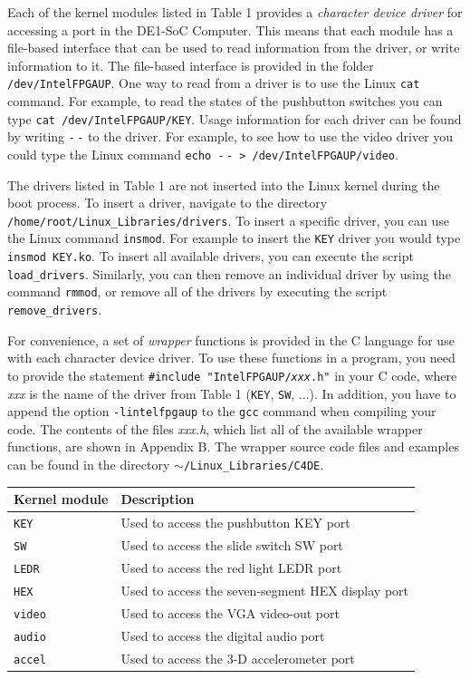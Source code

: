 \documentclass[11pt, twoside, pdftex]{article}
\begin{document}
Each of the kernel modules listed in Table 1 provides a {\it character device driver} for
accessing a port in the DE1-SoC Computer. This means that each module has a file-based
interface that can be used to read information from the driver, or write information to
it. The file-based interface is provided in the folder \texttt{/dev/IntelFPGAUP}. One way to
read from a driver is to use the Linux \texttt{cat} command. For example, to read the
states of the pushbutton switches you can type \texttt{cat /dev/IntelFPGAUP/KEY}. Usage 
information for each driver can be found by writing \texttt{-$\,$-} to the driver. For example, 
to see how to use the video driver you could type the Linux command
\texttt{echo -$\,$- > /dev/IntelFPGAUP/video}. 

The drivers listed in Table 1 are not inserted into the Linux kernel during the boot
process. To insert a driver, navigate to the directory
\texttt{/home/root/Linux\_Libraries/drivers}. To insert a specific driver, you can use the
Linux command \texttt{insmod}. For example to insert the \texttt{KEY} driver you would
type \texttt{insmod KEY.ko}. To insert all available drivers, you can execute the script
\texttt{load\_drivers}. Similarly, you can then remove an individual driver by using the
command \texttt{rmmod}, or remove all of the drivers by executing the script
\texttt{remove\_drivers}.

For convenience, a set of {\it wrapper} functions is provided in the C language for use with 
each character device driver. To use these functions in a program, you need 
to provide the statement \texttt{\#include "IntelFPGAUP/{\it xxx}.h"} in your C code, 
where {\it xxx} is the name of the driver from Table 1 (\texttt{KEY}, \texttt{SW}, $\ldots$). 
In addition, you have to append the option \texttt{-lintelfpgaup} to the \texttt{gcc} command when 
compiling your code. The contents of the files {\it xxx.h}, which list all of the 
available wrapper functions, are shown in Appendix B. The wrapper source code
files and examples can be found in the directory \texttt{$\sim$/Linux\_Libraries/C4DE}.

\begin{table}[H]
\centering
\begin{tabular}{l|p{8cm}}
{\bf Kernel module}	&	{\bf Description}\\\hline
\rule{0cm}{.5cm}\texttt{KEY}	&	Used to access the pushbutton KEY port\\
\texttt{SW}		&	Used to access the slide switch SW port\\
\texttt{LEDR}	&	Used to access the red light LEDR port\\
\texttt{HEX}	&	Used to access the seven-segment HEX display port\\
\texttt{video}	&	Used to access the VGA video-out port\\
\texttt{audio}	&	Used to access the digital audio port\\
\texttt{accel}	&	Used to access the 3-D accelerometer port\\
\end{tabular}
\label{tab:drivers}
\end{table}
\end{document}
